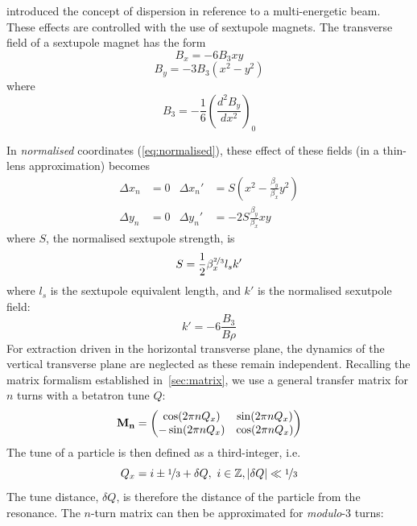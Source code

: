 \documentclass[a4paper,twoside,11pt]{report}
\begin{document}
 introduced the concept of dispersion in reference to a multi-energetic beam. These effects are controlled with the use of sextupole magnets. The transverse field of a sextupole magnet has the form
\begin{equation}
  B_x = -6B_3xy
\end{equation}
\begin{equation}
  B_y = -3B_3(x^2-y^2)
\end{equation} where
\begin{equation}
  B_3=-\frac 16\left(\frac{d^2B_y}{dx^2}\right)_0
\end{equation}

In \textit{normalised} coordinates (\autoref{eq:normalised}), these effect of these fields (in a thin-lens approximation) becomes
\begin{align*}
  \Delta x_n&=0 & \Delta x_n'&=S(x^2-\frac{\beta_y}{\beta_x}y^2) \\
  \Delta y_n&=0 & \Delta y_n'&=-2S\frac{\beta_y}{\beta_x}xy
\end{align*}
where $S$, the normalised sextupole strength, is
\begin{equation}
  S=\frac 12\beta_x^{\nicefrac 23}l_sk'
  \label{eq:normalised_sextupole_strength}
\end{equation} where $l_s$ is the sextupole equivalent length, and $k'$ is the normalised sexutpole field:
\begin{equation}
  k'=-6\frac{B_3}{B\rho}
\end{equation}
For extraction driven in the horizontal transverse plane, the dynamics of the vertical transverse plane are neglected as these remain independent. Recalling the matrix formalism established in~\autoref{sec:matrix}, we use a general transfer matrix for $n$ turns with a betatron tune $Q$:
\begin{equation}
  \bf M_n=
  \begin{pmatrix}
    \cos(2\pi nQ_x)  & \sin(2\pi nQ_x) \\
    -\sin(2\pi nQ_x) & \cos(2\pi nQ_x)
  \end{pmatrix}
\end{equation}
The tune of a particle is then defined as a third-integer, i.e.
\begin{equation}
  Q_x=i\pm\nicefrac 13 +\delta Q,\ i\in\mathbb{Z}, |\delta Q|\ll\nicefrac 13
\end{equation} 
The tune distance, $\delta Q$, is therefore the distance of the particle from the resonance. The $n$-turn matrix can then be approximated for \textit{modulo}-3 turns:
\end{document}
